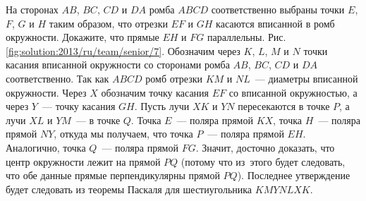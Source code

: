 \problem{}
На сторонах $AB$, $BC$, $CD$ и $DA$ ромба $ABCD$ соответственно выбраны точки
$E$, $F$, $G$ и $H$ таким образом, что отрезки $EF$ и $GH$ касаются вписанной в
ромб окружности.
Докажите, что прямые $EH$ и $FG$ параллельны.
%
\label{solution:2013/ru/team/senior/7}
Рис. \ref{fig:solution:2013/ru/team/senior/7}.
Обозначим через $K$, $L$, $M$ и $N$ точки касания вписанной окружности со
сторонами ромба $AB$, $BC$, $CD$ и $DA$ соответственно.
Так как $ABCD$ ромб отрезки $KM$ и $NL$~--- диаметры вписанной окружности.
Через $X$ обозначим точку касания $EF$ со вписанной окружностью, а через
$Y$~--- точку касания $GH$.
Пусть лучи $XK$ и $YN$ пересекаются в точке $P$, а лучи $XL$ и $YM$~--- в точке
$Q$.
Точка $E$~--- поляра прямой $KX$, точка $H$~--- поляра прямой $NY$, откуда мы
получаем, что точка $P$~--- поляра прямой $EH$.
Аналогично, точка $Q$~--- поляра прямой $FG$.
Значит, досточно доказать, что центр окружности лежит на прямой $PQ$
(потому что из~этого будет следовать, что обе данные прямые перпендикулярны
прямой $PQ$).
Последнее утверждение будет следовать из теоремы Паскаля для шестиугольника
$KMYNLXK$.
\endproblem
